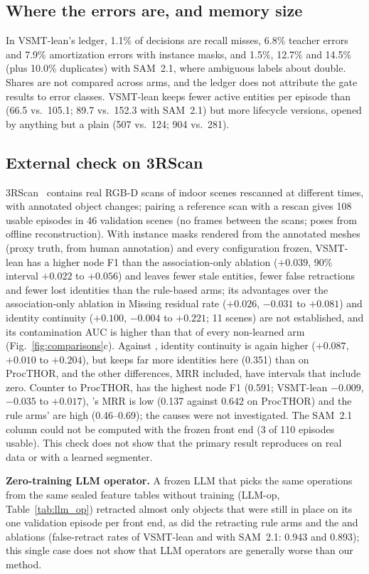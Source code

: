 \subsection{Where the errors are, and memory size}
In VSMT-lean's ledger, 1.1\% of decisions are recall misses, 6.8\% teacher errors and 7.9\% amortization errors with instance masks, and 1.5\%, 12.7\% and 14.5\% (plus 10.0\% duplicates) with SAM~2.1, where ambiguous labels about double. Shares are not compared across arms, and the ledger does not attribute the gate results to error classes.
VSMT-lean keeps fewer active entities per episode than  (66.5 vs.\ 105.1; 89.7 vs.\ 152.3 with SAM~2.1) but more lifecycle versions, opened by anything but a plain  (507 vs.\ 124; 904 vs.\ 281).

\subsection{External check on 3RScan}
\label{sec:external}
3RScan~\cite{rio2019} contains real RGB-D scans of indoor scenes rescanned at different times, with annotated object changes; pairing a reference scan with a rescan gives 108 usable episodes in 46 validation scenes (no frames between the scans; poses from offline reconstruction).
With instance masks rendered from the annotated meshes (proxy truth, from human annotation) and every configuration frozen, VSMT-lean has a higher node F1 than the association-only ablation ($+0.039$, 90\% interval $+0.022$ to $+0.056$) and leaves fewer stale entities, fewer false retractions and fewer lost identities than the rule-based arms; its advantages over the association-only ablation in Missing residual rate ($+0.026$, $-0.031$ to $+0.081$) and identity continuity ($+0.100$, $-0.004$ to $+0.221$; 11 scenes) are not established, and its contamination AUC is higher than that of every non-learned arm (Fig.~\ref{fig:comparisons}c).
Against , identity continuity is again higher ($+0.087$, $+0.010$ to $+0.204$), but  keeps far more identities here (0.351) than on ProcTHOR, and the other differences, MRR included, have intervals that include zero.
Counter to ProcTHOR,  has the highest node F1 (0.591; VSMT-lean $-0.009$, $-0.035$ to $+0.017$), 's MRR is low (0.137 against 0.642 on ProcTHOR) and the rule arms' are high (0.46--0.69); the causes were not investigated.
The SAM~2.1 column could not be computed with the frozen front end (3 of 110 episodes usable).
This check does not show that the primary result reproduces on real data or with a learned segmenter.

\textbf{Zero-training LLM operator.}
A frozen LLM that picks the same operations from the same sealed feature tables without training (LLM-op, Table~\ref{tab:llm_op}) retracted almost only objects that were still in place on its one validation episode per front end, as did the retracting rule arms and the  and  ablations (false-retract rates of VSMT-lean and  with SAM~2.1: 0.943 and 0.893); this single case does not show that LLM operators are generally worse than our method.
